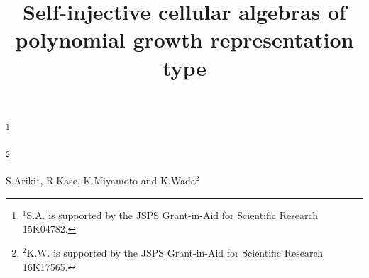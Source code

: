 \documentclass[12pt]{amsart}
\numberwithin{equation}{thm}
\newcounter{ni}
\begin{document}
\setlength{\baselineskip}{4.9mm}
\setlength{\abovedisplayskip}{4.5mm}
\setlength{\belowdisplayskip}{4.5mm}


\renewcommand{\theenumi}{\roman{enumi}}
\renewcommand{\labelenumi}{(\theenumi)}
\renewcommand{\thefootnote}{\fnsymbol{footnote}}
\renewcommand{\thefootnote}{\fnsymbol{footnote}}
\parindent=20pt


\setcounter{section}{0}




\title[Self-injective cellular algebras]{Self-injective cellular algebras of polynomial growth representation type}

\address{S.Ariki : Department of Pure and Applied Mathematics, Graduate School of Information Science and Technology, Osaka University, 1-5 Yamadaoka, Suita, Osaka 565-0871, Japan}
\thanks{$^1$S.A. is supported by the JSPS Grant-in-Aid for Scientific Research 15K04782.}

\address{R.Kase : Faculty of Informatics, Okayama University of Science, 1-1 Ridaicho, Kita-ku, Okayama-shi 700-0005, Japan}

\address{K.Miyamoto :  Department of Pure and Applied Mathematics, Graduate School of Information Science and Technology, Osaka University, 1-5 Yamadaoka, Suita, Osaka 565-0871, Japan}

\address{K.Wada : Department of Mathematics, Faculty of Science, Shinshu University, 
		Asahi 3-1-1, Matsumoto 390-8621, Japan}
\thanks{$^2$K.W. is supported by the JSPS Grant-in-Aid for Scientific Research 16K17565.}

\maketitle 


\begin{center}
S.Ariki$^1$, R.Kase, K.Miyamoto and K.Wada$^2$
\end{center}
\end{document}
